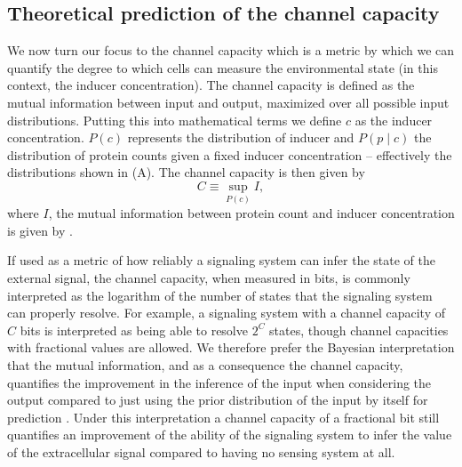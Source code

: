 \subsection{Theoretical prediction of the channel capacity}
\label{sec_channcap}

We now turn our focus to the channel capacity which is a metric by which we can
quantify the degree to which cells can measure the environmental state (in this
context, the inducer concentration). The channel capacity is defined as the
mutual information between input and output, maximized over all possible input
distributions. Putting this into mathematical terms we define $c$ as the
inducer concentration. $P(c)$ represents the distribution of inducer and $P(p
\mid c)$ the distribution of protein counts given a fixed inducer concentration
-- effectively the distributions shown in (A). The channel
capacity is then given by
\begin{equation}
  C \equiv \sup_{P(c)} I,
  \label{eq_chann_cap}
\end{equation}
where $I$, the mutual information between protein count and inducer
concentration is given by .

If used as a metric of how reliably a signaling system can infer the state of
the external signal, the channel capacity, when measured in bits, is commonly
interpreted as the logarithm of the number of states that the signaling system
can properly resolve. For example, a signaling system with a channel capacity
of $C$ bits is interpreted as being able to resolve $2^C$ states, though
channel capacities with fractional values are allowed. We therefore prefer
the Bayesian interpretation that the mutual information, and as a consequence
the channel capacity, quantifies the improvement in the inference of the input
when considering the output compared to just using the prior distribution of
the input by itself for prediction \cite{Voliotis2014a, Bowsher2014}. Under
this interpretation a channel capacity of a fractional bit still quantifies an
improvement of the ability of the signaling system to infer the value of the
extracellular signal compared to having no sensing system at all.

